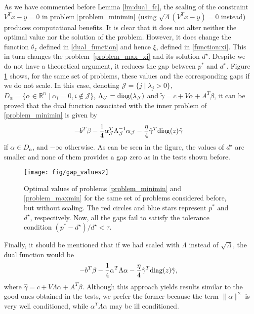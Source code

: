 \documentclass[smallextended,referee,envcountsect]{svjour3}
\newcommand{\R}{\mathbb{R}}
\begin{document}
As we have commented before Lemma \ref{lm:dual_fc}, the scaling of the constraint 
$V^Tx-y = 0$ in problem \eqref{problem_minimin} (using $\sqrt{\Lambda}(V^Tx-y) = 0$ 
instead) produces computational benefits. It is clear that it does not alter neither 
the optimal value nor the solution of the problem. However, it does change the function 
$\theta_z$ defined in \eqref{dual_function} and hence $\xi$, defined 
in \eqref{function:xi}. This in turn changes the problem~\eqref{problem_max_xi} and its 
solution $d^\star$. Despite we do not have a theoretical argument, it reduces the gap 
between $p^*$ and $d^\star$. Figure \ref{fig4} shows, for the same set of problems, 
these values and the corresponding gaps if we do not scale. In this case, denoting 
$\mathcal{J}=\{j\mid\lambda_j>0\}$, 
$D_\alpha=\{\alpha\in\R^n\mid\alpha_i=0, i\notin\mathcal{J}\}$, 
$\Lambda_\mathcal{J} = {\rm diag}(\lambda_\mathcal{J})$ and 
$\tilde\gamma=c+V\alpha+A^T\beta$, it can be proved that the dual function associated 
with the inner problem of \eqref{problem_minimin} is given by 
$$
-b^T\beta-\dfrac{1}{4}\alpha_\mathcal{J}^T\Lambda_\mathcal{J}^{-1}\alpha_\mathcal{J}-
\dfrac{\eta}{4}\tilde\gamma^T{\rm diag}(z)\tilde\gamma
$$
if $\alpha\in{D}_\alpha$, and $-\infty$ otherwise. As can be seen in the figure, the 
values of $d^\star$ are smaller and none of them provides a gap zero as in the tests 
shown before.

\begin{figure}[htbp]
\centering
\texttt{[image: fig/gap\_values2]}
\caption{Optimal values of problems \eqref{problem_minimin} and 
\eqref{problem_maxmin} for the same set of problems considered before, but without 
scaling. The red circles and blue stars represent $p^*$ and $d^\star$, respectively. 
Now, all the gaps fail to satisfy the tolerance condition 
${(p^*-d^\star)}/{d^\star} < \tau$.}
\label{fig4}
\end{figure}

Finally, it should be mentioned that if we had scaled with $\Lambda$ instead 
of $\sqrt{\Lambda}$, the dual function would be 
$$
-b^T\beta-\dfrac{1}{4}\alpha^T\Lambda\alpha-
\dfrac{\eta}{4}\hat\gamma^T{\rm diag}(z)\hat\gamma,
$$
where $\hat\gamma=c+V\Lambda\alpha+A^T\beta$. Although this approach yields results 
similar to the good ones obtained in the tests, we prefer the former because the term 
$\|\alpha\|^2$ is very well conditioned, while $\alpha^T\Lambda\alpha$ may be ill 
conditioned. 
\end{document}
